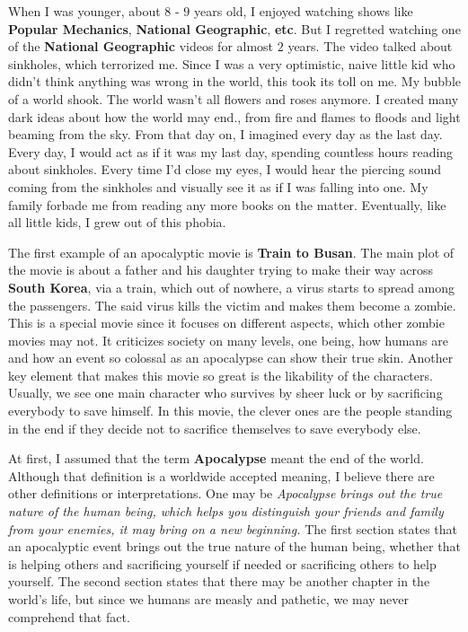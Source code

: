 \begin{essay}
  When I was younger, about $8$ - $9$ years old, I enjoyed watching shows like
  \textbf{Popular Mechanics}, \textbf{National Geographic}, \textbf{etc}. But I
  regretted watching one of the \textbf{National Geographic} videos for almost $2$
  years. The video talked about sinkholes, which terrorized me. Since I was a very
  optimistic, naive little kid who didn't think anything was wrong in the world,
  this took its toll on me. My bubble of a world shook. The world wasn't all
  flowers and roses anymore. I created many dark ideas about how the world may
  end., from fire and flames to floods and light beaming from the sky. From that
  day on, I imagined every day as the last day. Every day, I would act as if it
  was my last day, spending countless hours reading about sinkholes. Every time
  I'd close my eyes, I would hear the piercing sound coming from the sinkholes and
  visually see it as if I was falling into one. My family forbade me from reading
  any more books on the matter. Eventually, like all little kids, I grew out of
  this phobia.
  
  The first example of an apocalyptic movie is \textbf{Train to Busan}. The main
  plot of the movie is about a father and his daughter trying to make their way
  across \textbf{South Korea}, via a train, which out of nowhere, a virus starts
  to spread among the passengers. The said virus kills the victim and makes them
  become a zombie. This is a special movie since it focuses on different aspects,
  which other zombie movies may not. It criticizes society on many levels, one
  being, how humans are and how an event so colossal as an apocalypse can show
  their true skin. Another key element that makes this movie so great is the
  likability of the characters. Usually, we see one main character who survives by
  sheer luck or by sacrificing everybody to save himself. In this movie, the
  clever ones are the people standing in the end if they decide not to sacrifice
  themselves to save everybody else.
  
  At first, I assumed that the term \textbf{Apocalypse} meant the end of the
  world. Although that definition is a worldwide accepted meaning, I believe there
  are other definitions or interpretations. One may be \textit{Apocalypse brings
  out the true nature of the human being, which helps you distinguish your friends
  and family from your enemies, it may bring on a new beginning.} The first
  section states that an apocalyptic event brings out the true nature of the human
  being, whether that is helping others and sacrificing yourself if needed or
  sacrificing others to help yourself. The second section states that there may be
  another chapter in the world's life, but since we humans are measly and
  pathetic, we may never comprehend that fact.
\end{essay}

